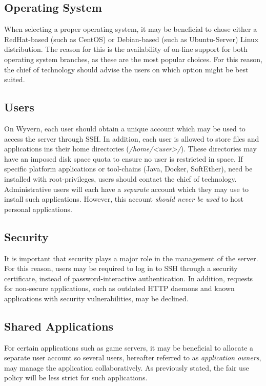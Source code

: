 \subsection{Operating System}
When selecting a proper operating system, it may be beneficial to chose either a RedHat-based (such as CentOS) or Debian-based (such as Ubuntu-Server) Linux distribution. The reason for this is the availability of on-line support for both operating system branches, as these are the most popular choices. For this reason, the chief of technology should advise the users on which option might be best suited.

\subsection{Users}
On Wyvern, each user should obtain a unique account which may be used to access the server through SSH. In addition, each user is allowed to store files and applications ins their home directories (\textit{/home/<user>/}). These directories may have an imposed disk space quota to ensure no user is restricted in space. If specific platform applications or tool-chains (Java, Docker, SoftEther), need be installed with root-privileges, users should contact the chief of technology. Administrative users will each have a \textit{separate} account which they may use to install such applications. However, this account \textit{should never be used} to host personal applications.

\subsection{Security}
It is important that security plays a major role in the management of the server. For this reason, users may be required to log in to SSH through a security certificate, instead of password-interactive authentication. In addition, requests for non-secure applications, such as outdated HTTP daemons and known applications with security vulnerabilities, may be declined.

\subsection{Shared Applications}
For certain applications such as game servers, it may be beneficial to allocate a separate user account so several users, hereafter referred to as \textit{application owners}, may manage the application collaboratively. As previously stated, the fair use policy will be less strict for such applications.
